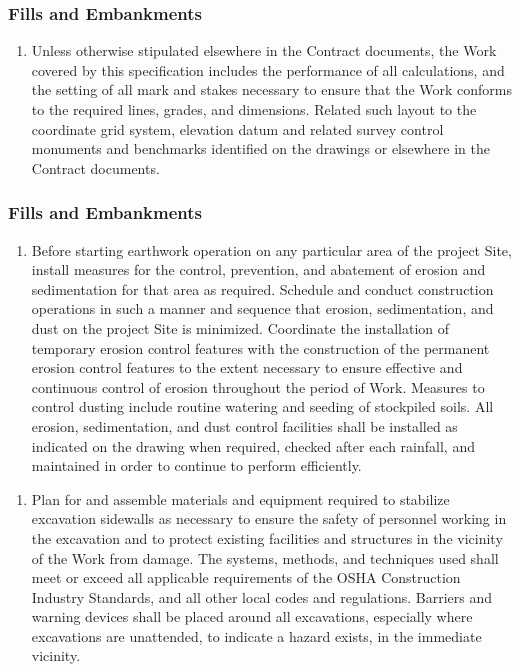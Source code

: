 \documentclass{article}%
\begin{document}
%
\subsubsection{Fills and Embankments}%
\label{ssubsec:FillsandEmbankments}%
\begin{enumerate}[label=\alph*),start=1]%
\item%
Unless otherwise stipulated elsewhere in the Contract documents, the Work covered by this specification includes the performance of all calculations, and the setting of all mark and stakes necessary to ensure that the Work conforms to the required lines, grades, and dimensions. Related such layout to the coordinate grid system, elevation datum and related survey control monuments and benchmarks identified on the drawings or elsewhere in the Contract documents.%
\end{enumerate}

%
\subsubsection{Fills and Embankments}%
\label{ssubsec:FillsandEmbankments}%
\begin{enumerate}[label=\alph*),start=1]%
\item%
Before starting earthwork operation on any particular area of the project Site, install measures for the control, prevention, and abatement of erosion and sedimentation for that area as required. Schedule and conduct construction operations in such a manner and sequence that erosion, sedimentation, and dust on the project Site is minimized. Coordinate the installation of temporary erosion control features with the construction of the permanent erosion control features to the extent necessary to ensure effective and continuous control of erosion throughout the period of Work. Measures to control dusting include routine watering and seeding of stockpiled soils. All erosion, sedimentation, and dust control facilities shall be installed as indicated on the drawing when required, checked after each rainfall, and maintained in order to continue to perform efficiently.%
\end{enumerate}%
\begin{enumerate}[label=\alph*),start=1]%
\item%
Plan for and assemble materials and equipment required to stabilize excavation sidewalls as necessary to ensure the safety of personnel working in the excavation and to protect existing facilities and structures in the vicinity of the Work from damage. The systems, methods, and techniques used shall meet or exceed all applicable requirements of the OSHA Construction Industry Standards, and all other local codes and regulations. Barriers and warning devices shall be placed around all excavations, especially where excavations are unattended, to indicate a hazard exists, in the immediate vicinity.%
\end{enumerate}
\end{document}
